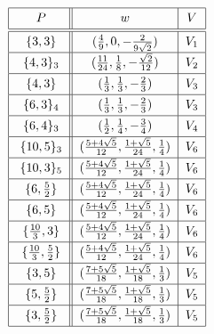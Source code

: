 \documentclass[12pt]{article}
\theoremstyle{definition}\newtheorem{definition}{Definition}[section]
\begin{document}
\begin{table}
$$\begin{array}{cc}
{\begin{tabular}{|c||c|c|} 
 \hline
 \rule{0pt}{2.5ex} $P$ & $w$ & $V$ \\ [0.5ex] 
 \hline\hline
 \rule{0pt}{2.5ex} $\{3,3\}$ & $(\frac{4}{9},0,-\frac{2}{9\sqrt{2}})$ & $V_1$ \\ [0.5ex]
 \hline
 \rule{0pt}{2.5ex} $\{4,3\}_3$ & $(\frac{11}{24}, \frac{1}{8}, -\frac{\sqrt{2}}{12})$ & $V_2$ \\ [0.5ex]
 \hline
 \rule{0pt}{2.5ex} $\{4,3\}$ & $(\frac{1}{3},\frac{1}{3},-\frac{2}{3})$ & $V_3$ \\ [0.5ex]
 \hline
 \rule{0pt}{2.5ex} $\{6,3\}_4$ & $(\frac{1}{3},\frac{1}{3},-\frac{2}{3})$ & $V_3$ \\ [0.5ex]
 \hline
 \rule{0pt}{2.5ex} $\{6,4\}_3$ & $(\frac{1}{2},\frac{1}{4},-\frac{3}{4})$ & $V_4$ \\ [0.5ex]
 \hline
\rule{0pt}{2.5ex} $\{10,5\}_3$ & $(\frac{5+4\sqrt{5}}{12},\frac{1+\sqrt{5}}{24},\frac{1}{4})$ & $V_6$ \\ [0.5ex]
 \hline
 \rule{0pt}{2.5ex} $\{10,3\}_5$ & $(\frac{5+4\sqrt{5}}{12},\frac{1+\sqrt{5}}{24},\frac{1}{4})$ & $V_6$ \\ [0.5ex]
 \hline
 \rule{0pt}{2.5ex} $\{6,\frac{5}{2}\}$ & $(\frac{5+4\sqrt{5}}{12},\frac{1+\sqrt{5}}{24},\frac{1}{4})$ & $V_6$ \\ [0.5ex]
 \hline
 \rule{0pt}{2.5ex} $\{6,5\}$ & $(\frac{5+4\sqrt{5}}{12},\frac{1+\sqrt{5}}{24},\frac{1}{4})$ & $V_6$ \\ [0.5ex]
 \hline
 \rule{0pt}{2.5ex} $\{\frac{10}{3},3\}$ & $(\frac{5+4\sqrt{5}}{12},\frac{1+\sqrt{5}}{24},\frac{1}{4})$ & $V_6$ \\ [0.5ex]
 \hline
 \rule{0pt}{2.5ex} $\{\frac{10}{3},\frac{5}{2}\}$ & $(\frac{5+4\sqrt{5}}{12},\frac{1+\sqrt{5}}{24},\frac{1}{4})$ & $V_6$ \\ [0.5ex]
 \hline
 \rule{0pt}{2.5ex} $\{3,5\}$ & $(\frac{7+5\sqrt{5}}{18},\frac{1+\sqrt{5}}{18},\frac{1}{3})$ & $V_5$ \\ [0.5ex]
 \hline
 \rule{0pt}{2.5ex} $\{5,\frac{5}{2}\}$ & $(\frac{7+5\sqrt{5}}{18},\frac{1+\sqrt{5}}{18},\frac{1}{3})$ & $V_5$ \\ [0.5ex]
 \hline
 \rule{0pt}{2.5ex} $\{3,\frac{5}{2}\}$ & $(\frac{7+5\sqrt{5}}{18},\frac{1+\sqrt{5}}{18},\frac{1}{3})$ & $V_5$ \\ [0.5ex]
 \hline
\end{tabular}} &
{\begin{tabular}{|c||l|}%

\end{tabular}}
\end{array}$$
\end{table}
\end{document}
